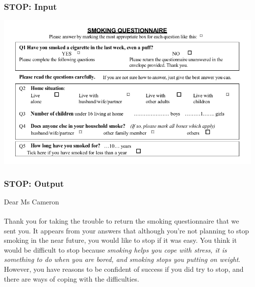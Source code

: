 \documentclass[compress,color=usenames]{beamer}
\begin{document}
\begin{frame}
\frametitle{STOP: Input}

\vspace*{-.5cm}
\begin{center}
\includegraphics[scale=.5]{pics/pic4.jpg}
\end{center}

\end{frame}

\begin{frame}
\frametitle{STOP: Output}

Dear Ms Cameron\\ \ \\

 { {Thank you for taking the trouble to return the smoking questionnaire that we sent you. It appears from your answers that although you're not planning to stop smoking in the near future, you would like to stop if it was easy. You think it would be difficult to stop because \textit{smoking helps you cope with stress, it is something to do when you are bored, and smoking stops you putting on weight}. However, you have reasons to be confident of success if you did try to stop, and there are ways of coping with the difficulties. }}

\end{frame}
\end{document}
